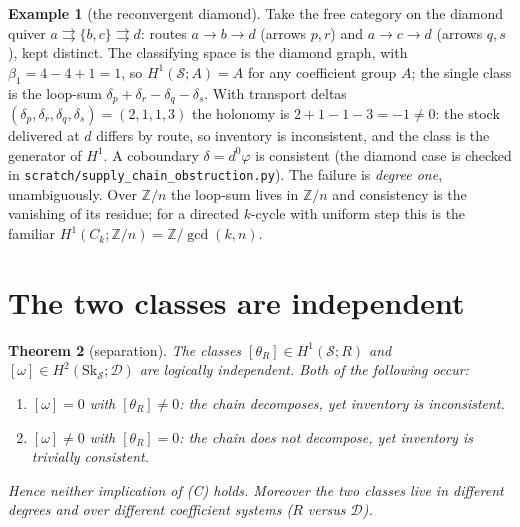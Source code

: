 \documentclass[11pt]{article}
\newtheorem{theorem}{Theorem}
\theoremstyle{definition}
\newtheorem{example}[theorem]{Example}
\newcommand{\Sc}{\mathcal{S}}
\newcommand{\D}{\mathcal{D}}
\newcommand{\Sk}{\mathrm{Sk}}
\newcommand{\Z}{\mathbb{Z}}
\begin{document}
\begin{example}[the reconvergent diamond]\label{ex:diamond}
Take the free category on the diamond quiver $a\rightrightarrows\{b,c\}\rightrightarrows d$:
routes $a\to b\to d$ (arrows $p,r$) and $a\to c\to d$ (arrows $q,s$), kept distinct. The
classifying space is the diamond graph, with $\beta_1=4-4+1=1$, so $H^1(\Sc;A)=A$ for any
coefficient group $A$; the single class is the loop-sum
$\delta_p+\delta_r-\delta_q-\delta_s$. With transport deltas $(\delta_p,\delta_r,\delta_q,\delta_s)
=(2,1,1,3)$ the holonomy is $2+1-1-3=-1\neq0$: the stock delivered at $d$ differs by route, so
inventory is inconsistent, and the class is the generator of $H^1$. A coboundary
$\delta=d^0\varphi$ is consistent (the diamond case is checked in
\texttt{scratch/supply\_chain\_obstruction.py}). The failure is \emph{degree one}, unambiguously.
Over $\Z/n$ the loop-sum lives in $\Z/n$ and consistency is the vanishing of its residue; for a
directed $k$-cycle with uniform step this is the familiar $H^1(C_k;\Z/n)=\Z/\gcd(k,n)$.
\end{example}

\section{The two classes are independent}\label{sec:separation}

\begin{theorem}[separation]\label{thm:separation}
The classes $[\theta_R]\in H^1(\Sc;R)$ and $[\omega]\in H^2(\Sk_\Sc;\D)$ are logically
independent. Both of the following occur:
\begin{enumerate}
\item[\textup{(W1)}] $[\omega]=0$ with $[\theta_R]\neq0$: the chain decomposes, yet inventory is
inconsistent.
\item[\textup{(W2)}] $[\omega]\neq0$ with $[\theta_R]=0$: the chain does not decompose, yet
inventory is trivially consistent.
\end{enumerate}
Hence neither implication of (C) holds. Moreover the two classes live in different degrees and
over different coefficient systems ($R$ versus $\D$).
\end{theorem}
\end{document}
